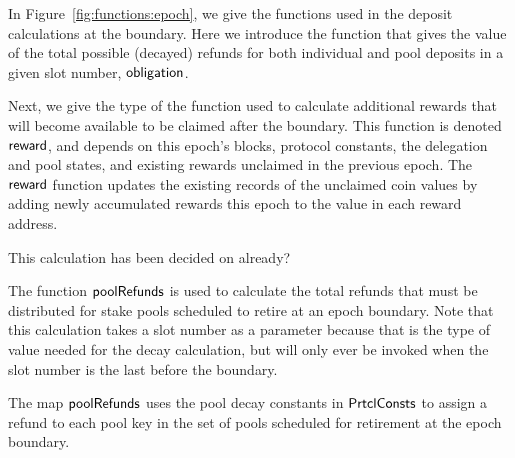 In Figure~\ref{fig:functions:epoch}, we give the functions
used in the deposit calculations at the boundary. Here we introduce the function
that gives the value of the total possible (decayed) refunds for both individual and
pool deposits in a given slot number, $\mathsf{obligation}$.

Next, we give the type of the function used to calculate additional rewards that will become
available to be claimed after the boundary. This function is denoted $\mathsf{reward}$,
and depends on this epoch's blocks, protocol constants, the delegation
and pool states, and existing rewards unclaimed in the previous epoch.
The $\mathsf{reward}$ function
updates the existing records of the unclaimed coin values by adding newly
accumulated rewards this epoch to the value in each reward address.

\begin{todo}
  This calculation has been decided on already?
\end{todo}

The function $\mathsf{poolRefunds}$ is used to calculate the total refunds
that must be distributed
for stake pools scheduled to retire at an epoch boundary. Note that this
calculation takes a slot number as a parameter because that is the type of value
needed for the decay calculation, but will only ever be invoked
when the slot number is the last before the boundary.

The map $\mathsf{poolRefunds}$ uses the pool decay constants in $\mathsf{PrtclConsts}$
to assign a refund to each pool key in the set of pools scheduled for retirement
at the epoch boundary.

